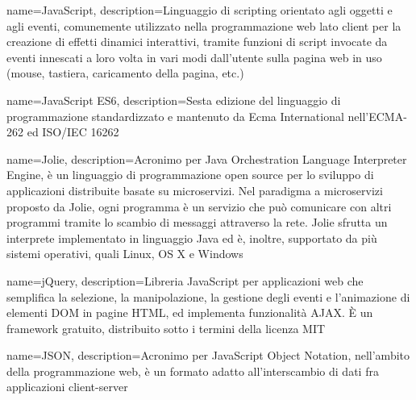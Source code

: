{
	name=JavaScript,
	description={Linguaggio di scripting orientato agli oggetti e agli eventi, comunemente utilizzato nella programmazione web lato client per la creazione di effetti dinamici interattivi, tramite funzioni di script invocate da eventi innescati a loro volta in vari modi dall'utente sulla pagina web in uso (mouse, tastiera, caricamento della pagina, etc.)}
}

{
	name=JavaScript ES6,
	description={Sesta edizione del linguaggio di programmazione standardizzato e mantenuto da Ecma International nell'ECMA-262 ed ISO/IEC 16262}
}


{
	name=Jolie,
	description={Acronimo per Java Orchestration Language Interpreter Engine, è un linguaggio di programmazione open source per lo sviluppo di applicazioni distribuite basate su microservizi. Nel paradigma a microservizi proposto da Jolie, ogni programma è un servizio che può comunicare con altri programmi tramite lo scambio di messaggi attraverso la rete. Jolie sfrutta un interprete implementato in linguaggio Java ed è, inoltre, supportato da più sistemi operativi, quali Linux, OS X e Windows}
}

{
	name=jQuery,
	description={Libreria JavaScript per applicazioni web che semplifica la selezione, la manipolazione, la gestione degli eventi e l'animazione di elementi DOM in pagine HTML, ed implementa funzionalità AJAX. \MakeUppercase{è} un framework gratuito, distribuito sotto i termini della licenza MIT}
}

{
	name=JSON,
	description={Acronimo per JavaScript Object Notation, nell'ambito della programmazione web, è un formato adatto all'interscambio di dati fra applicazioni client-server}
}
